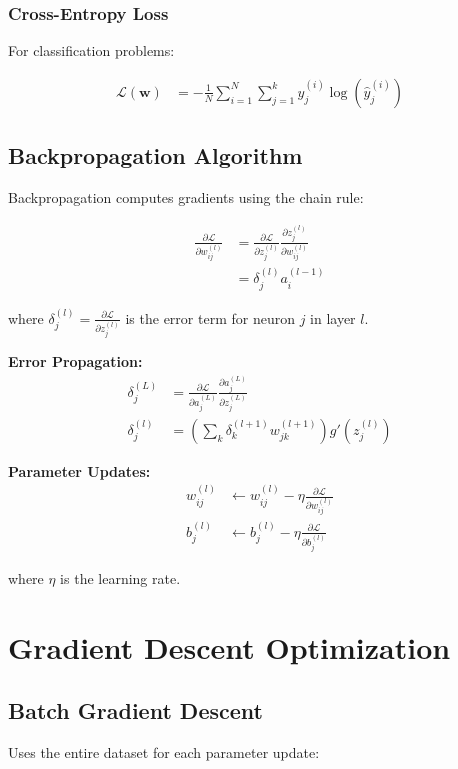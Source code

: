 \documentclass{article}
\begin{document}
\subsubsection{Cross-Entropy Loss}
For classification problems:

\begin{align}
\mathcal{L}(\boldsymbol{w}) &= -\frac{1}{N} \sum_{i=1}^{N} \sum_{j=1}^{k} y_j^{(i)} \log(\hat{y}_j^{(i)})
\end{align}

\subsection{Backpropagation Algorithm}

Backpropagation computes gradients using the chain rule:

\begin{align}
\frac{\partial \mathcal{L}}{\partial w_{ij}^{(l)}} &= \frac{\partial \mathcal{L}}{\partial z_j^{(l)}} \frac{\partial z_j^{(l)}}{\partial w_{ij}^{(l)}} \\
&= \delta_j^{(l)} a_i^{(l-1)}
\end{align}

where $\delta_j^{(l)} = \frac{\partial \mathcal{L}}{\partial z_j^{(l)}}$ is the error term for neuron $j$ in layer $l$.

\textbf{Error Propagation:}
\begin{align}
\delta_j^{(L)} &= \frac{\partial \mathcal{L}}{\partial a_j^{(L)}} \frac{\partial a_j^{(L)}}{\partial z_j^{(L)}} \\
\delta_j^{(l)} &= \left(\sum_{k} \delta_k^{(l+1)} w_{jk}^{(l+1)}\right) g'(z_j^{(l)})
\end{align}

\textbf{Parameter Updates:}
\begin{align}
w_{ij}^{(l)} &\leftarrow w_{ij}^{(l)} - \eta \frac{\partial \mathcal{L}}{\partial w_{ij}^{(l)}} \\
b_j^{(l)} &\leftarrow b_j^{(l)} - \eta \frac{\partial \mathcal{L}}{\partial b_j^{(l)}}
\end{align}

where $\eta$ is the learning rate.

\section{Gradient Descent Optimization}

\subsection{Batch Gradient Descent}
Uses the entire dataset for each parameter update:
\end{document}
